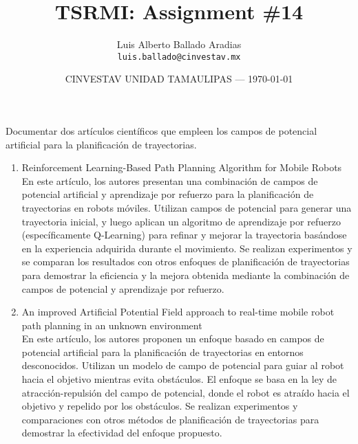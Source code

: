 \documentclass{article}
\title{TSRMI: Assignment \#14} %
\author{Luis Alberto Ballado Aradias\\ \texttt{luis.ballado@cinvestav.mx}} %
\date{CINVESTAV UNIDAD TAMAULIPAS --- \today} %
\begin{document}
\maketitle %


Documentar dos artículos científicos que empleen los campos de potencial artificial para la planificación de trayectorias.\\

\begin{enumerate}
\item Reinforcement Learning-Based Path Planning Algorithm for Mobile Robots\\

  En este artículo, los autores presentan una combinación de campos de potencial artificial y aprendizaje por refuerzo para la planificación de trayectorias en robots móviles. Utilizan campos de potencial para generar una trayectoria inicial, y luego aplican un algoritmo de aprendizaje por refuerzo (específicamente Q-Learning) para refinar y mejorar la trayectoria basándose en la experiencia adquirida durante el movimiento. Se realizan experimentos y se comparan los resultados con otros enfoques de planificación de trayectorias para demostrar la eficiencia y la mejora obtenida mediante la combinación de campos de potencial y aprendizaje por refuerzo.
  
\item An improved Artificial Potential Field approach to real-time mobile robot path planning in an unknown environment\\

  En este artículo, los autores proponen un enfoque basado en campos de potencial artificial para la planificación de trayectorias en entornos desconocidos. Utilizan un modelo de campo de potencial para guiar al robot hacia el objetivo mientras evita obstáculos. El enfoque se basa en la ley de atracción-repulsión del campo de potencial, donde el robot es atraído hacia el objetivo y repelido por los obstáculos. Se realizan experimentos y comparaciones con otros métodos de planificación de trayectorias para demostrar la efectividad del enfoque propuesto.
  
\end{enumerate}
\end{document}
